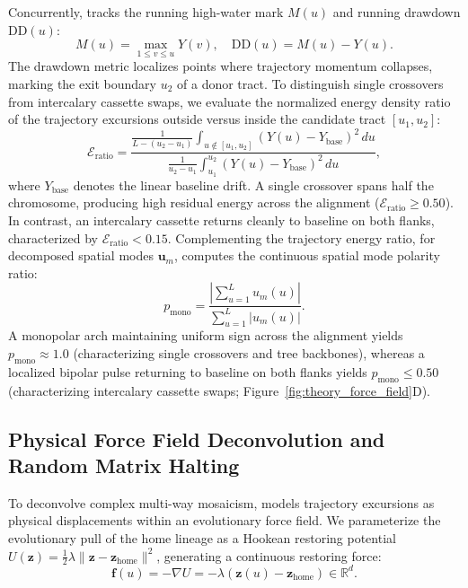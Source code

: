 Concurrently, \RhizAeon tracks the running high-water mark $M(u)$ and running drawdown $\text{DD}(u)$:
\begin{equation}
M(u) = \max_{1 \le v \le u} Y(v), \quad \text{DD}(u) = M(u) - Y(u).
\label{eq:methods_running_dd}
\end{equation}
The drawdown metric localizes points where trajectory momentum collapses, marking the exit boundary $u_2$ of a donor tract.
To distinguish single crossovers from intercalary cassette swaps, we evaluate the normalized energy density ratio of the trajectory excursions outside versus inside the candidate tract $[u_1, u_2]$:
\begin{equation}
\mathcal{E}_{\text{ratio}} = \frac{\frac{1}{L - (u_2 - u_1)} \int_{u \notin [u_1, u_2]} (Y(u) - Y_{\text{base}})^2 \, du}{\frac{1}{u_2 - u_1} \int_{u_1}^{u_2} (Y(u) - Y_{\text{base}})^2 \, du},
\label{eq:methods_energy_ratio}
\end{equation}
where $Y_{\text{base}}$ denotes the linear baseline drift.
A single crossover spans half the chromosome, producing high residual energy across the alignment ($\mathcal{E}_{\text{ratio}} \ge 0.50$).
In contrast, an intercalary cassette returns cleanly to baseline on both flanks, characterized by $\mathcal{E}_{\text{ratio}} < 0.15$.
Complementing the trajectory energy ratio, for decomposed spatial modes $\mathbf{u}_m$, \RhizAeon computes the continuous spatial mode polarity ratio:
\begin{equation}
p_{\text{mono}} = \frac{\left| \sum_{u=1}^L u_m(u) \right|}{\sum_{u=1}^L |u_m(u)|}.
\label{eq:methods_polarity_ratio}
\end{equation}
A monopolar arch maintaining uniform sign across the alignment yields $p_{\text{mono}} \approx 1.0$ (characterizing single crossovers and tree backbones), whereas a localized bipolar pulse returning to baseline on both flanks yields $p_{\text{mono}} \le 0.50$ (characterizing intercalary cassette swaps; Figure~\ref{fig:theory_force_field}D).

\subsection{Physical Force Field Deconvolution and Random Matrix Halting}
\label{subsec:methods_force_field}

To deconvolve complex multi-way mosaicism, \RhizAeon models trajectory excursions as physical displacements within an evolutionary force field.
We parameterize the evolutionary pull of the home lineage as a Hookean restoring potential $U(\mathbf{z}) = \frac{1}{2} \lambda \|\mathbf{z} - \mathbf{z}_{\text{home}}\|^2$, generating a continuous restoring force:
\begin{equation}
\mathbf{f}(u) = -\nabla U = -\lambda \left(\mathbf{z}(u) - \mathbf{z}_{\text{home}}\right) \in \mathbb{R}^d.
\label{eq:methods_force_vector}
\end{equation}

